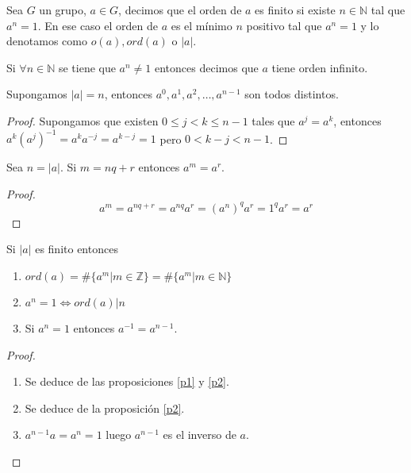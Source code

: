 \begin{defn}
Sea $G$ un grupo, $a \in G$, decimos que el orden de $a$ es finito si existe $n \in \mathbb{N}$ tal que $a^n = 1$. En ese caso el orden de $a$ es el m\'inimo $n$ positivo tal que $a^n = 1$ y lo denotamos como $o(a), ord(a)$ o $|a|$.

Si $\forall n \in \mathbb{N}$ se tiene que $a^n \neq 1$ entonces decimos que $a$ tiene orden infinito.
\end{defn}

\begin{prop}
\label{p1}
Supongamos $|a| = n$, entonces $a^0, a^1, a^2, \dots, a^{n-1}$ son todos distintos.
\end{prop}

\begin{proof}
Supongamos que existen $0 \leq j < k \leq n-1$ tales que $a^j = a^k$, entonces $a^k (a^j)^{-1} = a^k a^{-j} = a^{k-j} = 1$ pero $0 < k-j < n-1$.
\end{proof}

\begin{prop}
\label{p2}
Sea $n = |a|$. Si $m = nq+r$ entonces $a^m = a^r$.
\end{prop}

\begin{proof}
$$a^m = a^{nq+r} = a^{nq} a^r = (a^n)^q a^r = 1^q a^r = a^r$$
\end{proof}

\begin{prop}
Si $|a|$ es finito entonces

\begin{enumerate}
\item $ord(a) = \#\{a^m | m \in \mathbb{Z}\} = \#\{a^m | m \in \mathbb{N}\}$
\item $a^n = 1 \Leftrightarrow ord(a) | n$
\item Si $a^n = 1$ entonces $a^{-1} = a^{n-1}$.
\end{enumerate}
\end{prop}

\begin{proof} $ $

\begin{enumerate}
\item Se deduce de las proposiciones \ref{p1} y \ref{p2}.
\item Se deduce de la proposici\'on \ref{p2}.
\item $a^{n-1}a = a^n = 1$ luego $a^{n-1}$ es el inverso de $a$.
\end{enumerate}
\end{proof}

